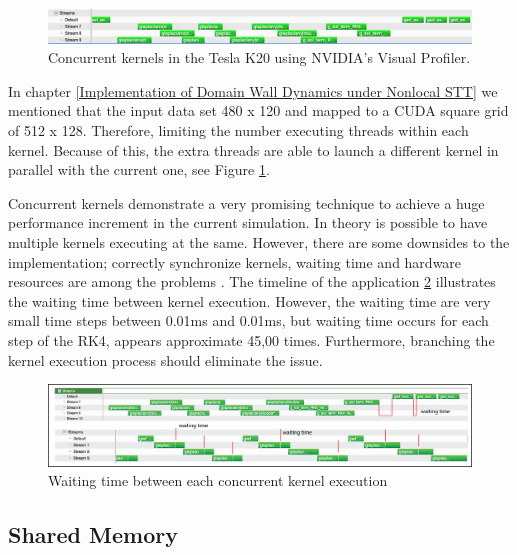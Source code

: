 \begin{figure}[htbp]
	\centering
		\includegraphics[width=1.0\textwidth]{Figures/concurent.png}
		\smallskip
	\caption[Streams kernels Tesla K20]{Concurrent kernels in the Tesla K20 using NVIDIA's Visual Profiler.}
	\label{fig:concurrent}
\end{figure}

In chapter \ref{Implementation of Domain Wall Dynamics under Nonlocal STT} we mentioned that the input data set 480 x 120 and mapped to a CUDA square grid of 512 x 128. Therefore, limiting the number executing threads within each kernel. Because of this, the extra threads  are able to launch a different kernel in parallel with the current one, see Figure  \ref{fig:concurrent}.

Concurrent kernels demonstrate a very promising technique to achieve a huge performance increment in the current simulation. In theory is possible to have multiple kernels executing at the same. However, there are some downsides to the implementation; correctly synchronize kernels, waiting time and hardware resources are among the  problems \cite{practices}. The timeline of the application \ref{fig:waittime} illustrates the waiting time between kernel execution. However, the waiting time are very small time steps between 0.01ms and 0.01ms, but waiting time occurs for each step of the RK4, appears approximate 45,00 times. Furthermore, branching the kernel execution process should eliminate the issue.

\begin{figure}[htbp]
	\centering
		\includegraphics[width=1.0\textwidth]{Figures/waittime.png}
		\smallskip
	\caption[Waiting time in concurrent kernels]{Waiting time between each concurrent kernel execution}
	\label{fig:waittime}
\end{figure}


\subsection{Shared Memory}

